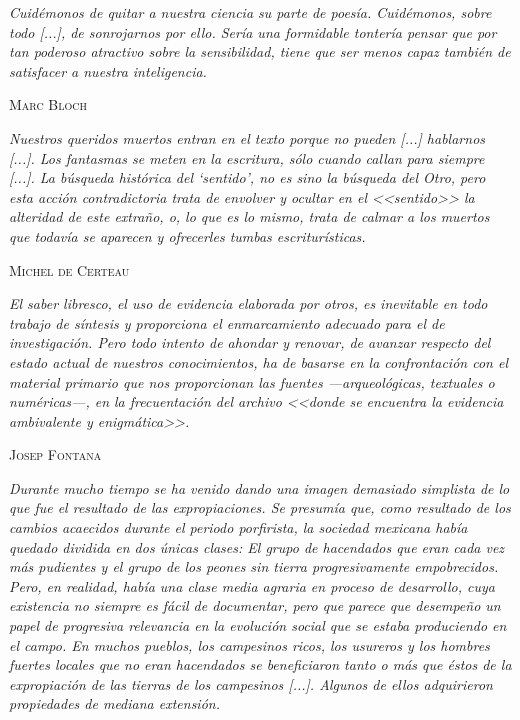 \documentclass[14pt,twoside,final]{extbook} %
\begin{document}
\begin{flushright}
\footnotesize
\begin{minipage}{8cm}
\emph{Cuidémonos de quitar a nuestra ciencia su parte de poesía. Cuidémonos, sobre todo [...], de sonrojarnos por ello. Sería una formidable tontería pensar que por tan poderoso atractivo sobre la sensibilidad, tiene que ser menos capaz también de satisfacer a nuestra inteligencia.}
\begin{flushright}
\textsc{Marc Bloch}
\end{flushright}
\begin{flushright}
\begin{minipage}{8cm}
\emph{Nuestros queridos muertos entran en el texto porque no pueden [...] hablarnos [...]. Los fantasmas se meten en la escritura, sólo cuando callan para siempre [...]. La búsqueda histórica del `sentido', no es sino la búsqueda del \emph{Otro}, pero esta acción contradictoria trata de envolver y ocultar en el <<sentido>> la alteridad de este extraño, o, lo que es lo mismo, trata de calmar a los muertos que todavía se aparecen y ofrecerles tumbas escriturísticas.}
\end{minipage}
\end{flushright}
\begin{flushright}
\textsc{Michel de Certeau}
\end{flushright}
\begin{flushright}
\begin{minipage}{8cm}
\emph{El saber libresco, el uso de evidencia elaborada por otros, es inevitable en todo trabajo de síntesis y proporciona el enmarcamiento adecuado para el de investigación. Pero todo intento de ahondar y renovar, de avanzar respecto del estado actual de nuestros conocimientos, ha de basarse en la confrontación con el material primario que nos proporcionan las fuentes ---arqueológicas, textuales o numéricas---, en la frecuentación del archivo <<donde se encuentra la evidencia ambivalente y enigmática>>.}
\end{minipage}
\end{flushright}
\begin{flushright}
\textsc{Josep Fontana}
\end{flushright}
\begin{flushright}
\begin{minipage}{8cm}
\emph{Durante mucho tiempo se ha venido dando una imagen demasiado simplista de lo que fue el resultado de las expropiaciones. Se presumía que, como resultado de los cambios acaecidos durante el
periodo porfirista, la sociedad mexicana había quedado dividida en dos únicas clases: El grupo de hacendados que eran cada vez más pudientes y el grupo de los peones sin tierra progresivamente empobrecidos. Pero, en realidad, había una clase media agraria en proceso de desarrollo, cuya existencia no siempre es fácil de documentar, pero que parece que desempeño un papel de progresiva relevancia en la evolución social que se estaba produciendo en el campo. En muchos pueblos, los campesinos ricos, los usureros y los hombres fuertes locales que no eran hacendados se beneficiaron tanto o más que éstos de la expropiación de las tierras de los campesinos [...]. Algunos de ellos adquirieron propiedades de mediana extensión.}

\end{minipage}
\end{flushright}
\end{minipage}
\end{flushright}
\end{document}
